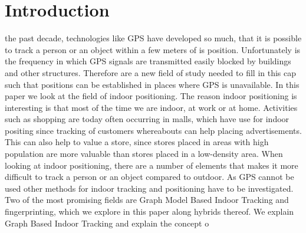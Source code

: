 \section{Introduction}
 the past decade, technologies like GPS have developed so much, that it is possible to track a person or an object within a few meters of is position. 
Unfortunately is the frequency in which GPS signals are transmitted easily blocked by buildings and other structures. 
Therefore are a new field of study needed to fill in this cap such that positions can be established in places where GPS is unavailable.
In this paper we look at the field of indoor positioning. 
The reason indoor positioning is interesting is that most of the time we are indoor, at work or at home. 
Activities such as shopping are today often occurring in malls, which have use for indoor positing since tracking of customers whereabouts can help placing advertisements. 
This can also help to value a store, since stores placed in areas with high population are more valuable than stores placed in a low-density area.
When looking at indoor positioning, there are a number of elements that makes it more difficult to track a person or an object compared to outdoor.
As GPS cannot be used other methods for indoor tracking and positioning have to be investigated. 
Two of the most promising fields are Graph Model Based Indoor Tracking and fingerprinting, which we explore in this paper along hybrids thereof. 
We explain Graph Based Indoor Tracking and explain the concept o  




